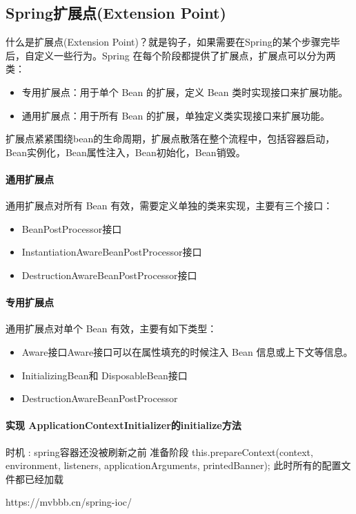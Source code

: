 \documentclass[../../../interview-questions.tex]{subfiles}
\begin{document}
\subsection{Spring扩展点(Extension Point)}

什么是扩展点(Extension Point)？就是钩子，如果需要在Spring的某个步骤完毕后，自定义一些行为。Spring 在每个阶段都提供了扩展点，扩展点可以分为两类：

\begin{itemize}
    \item {专用扩展点：用于单个 Bean 的扩展，定义 Bean 类时实现接口来扩展功能。}
    \item {通用扩展点：用于所有 Bean 的扩展，单独定义类实现接口来扩展功能。}
\end{itemize}

扩展点紧紧围绕bean的生命周期，扩展点散落在整个流程中，包括容器启动，Bean实例化，Bean属性注入，Bean初始化，Bean销毁。

\paragraph{通用扩展点}

通用扩展点对所有 Bean 有效，需要定义单独的类来实现，主要有三个接口：

\begin{itemize}
    \item {BeanPostProcessor接口}
    \item {InstantiationAwareBeanPostProcessor接口}
    \item {DestructionAwareBeanPostProcessor接口}
\end{itemize}

\paragraph{专用扩展点}

通用扩展点对单个 Bean 有效，主要有如下类型：

\begin{itemize}
    \item {Aware接口}Aware接口可以在属性填充的时候注入 Bean 信息或上下文等信息。
    \item {InitializingBean和 DisposableBean接口}
    \item {DestructionAwareBeanPostProcessor}
\end{itemize}

\paragraph{实现 ApplicationContextInitializer的initialize方法}


时机 : spring容器还没被刷新之前 准备阶段 this.prepareContext(context, environment, listeners, applicationArguments, printedBanner); 此时所有的配置文件都已经加载


https://mvbbb.cn/spring-ioc/
\end{document}
